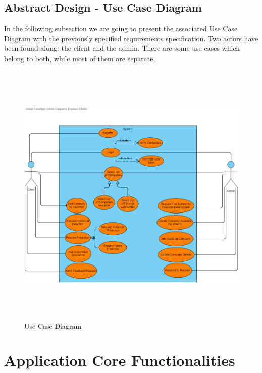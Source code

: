 \subsection{Abstract Design - Use Case Diagram}
In the following subsection we are going to present the associated Use Case Diagram with the previously specified requirements specification. Two actors have been found along: the client and the admin. There are some use cases which belong to both, while most of them are separate.

\begin{figure}[H]
\centering
\includegraphics[height=13cm]{images/UseCaseDiagram.png} 
\caption{Use Case Diagram}
\label{fig:usecasediagram}
\end{figure}


\section{Application Core Functionalities}